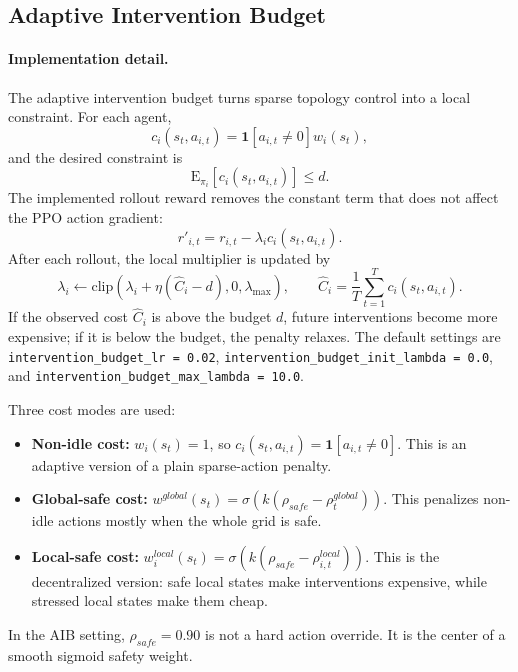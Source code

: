 \subsection{Adaptive Intervention Budget}
\label{subsec:sparse-control-aib}

\paragraph{Implementation detail.}
The adaptive intervention budget turns sparse topology control into a local
constraint. For each agent,
\[
  c_i(s_t,a_{i,t})=
  \mathbf{1}[a_{i,t}\neq0]w_i(s_t),
\]
and the desired constraint is
\[
  \mathrm{E}_{\pi_i}\left[c_i(s_t,a_{i,t})\right]\le d.
\]
The implemented rollout reward removes the constant term that does not affect
the PPO action gradient:
\[
  r'_{i,t}=r_{i,t}-\lambda_i c_i(s_t,a_{i,t}).
\]
After each rollout, the local multiplier is updated by
\[
  \lambda_i\leftarrow
  \mathrm{clip}\left(
    \lambda_i+\eta(\hat C_i-d),
    0,
    \lambda_{\max}
  \right),
  \qquad
  \hat C_i=\frac{1}{T}\sum_{t=1}^{T}c_i(s_t,a_{i,t}).
\]
If the observed cost \(\hat C_i\) is above the budget \(d\), future
interventions become more expensive; if it is below the budget, the penalty
relaxes. The default settings are \texttt{intervention\_budget\_lr = 0.02},
\texttt{intervention\_budget\_init\_lambda = 0.0}, and
\texttt{intervention\_budget\_max\_lambda = 10.0}.

Three cost modes are used:
\begin{itemize}
  \item \textbf{Non-idle cost:}
  \(w_i(s_t)=1\), so
  \(c_i(s_t,a_{i,t})=\mathbf{1}[a_{i,t}\neq0]\). This is an adaptive version
  of a plain sparse-action penalty.
  \item \textbf{Global-safe cost:}
  \(w^{global}(s_t)=\sigma(k(\rho_{safe}-\rho_t^{global}))\). This penalizes
  non-idle actions mostly when the whole grid is safe.
  \item \textbf{Local-safe cost:}
  \(w_i^{local}(s_t)=\sigma(k(\rho_{safe}-\rho_{i,t}^{local}))\). This is the
  decentralized version: safe local states make interventions expensive, while
  stressed local states make them cheap.
\end{itemize}
In the AIB setting, \(\rho_{safe}=0.90\) is not a hard action override. It is
the center of a smooth sigmoid safety weight.

